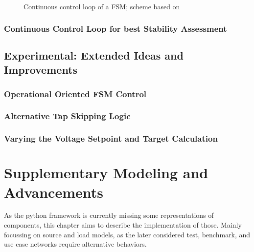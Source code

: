 \begin{figure}[htb!]
        \centering
        \caption{Continuous control loop of a \acs{FSM}; scheme based on \textcite{burlakinEnhancedVoltageControl2024}}
        \label{fig:fsm-continuous-control-loop}
\end{figure}

\subsubsection{Continuous Control Loop for best Stability Assessment}

\subsection{Experimental: Extended Ideas and Improvements}

\subsubsection{Operational Oriented FSM Control}

\subsubsection{Alternative Tap Skipping Logic}

\subsubsection{Varying the Voltage Setpoint and Target Calculation}


\section{Supplementary Modeling and Advancements}

As the python framework is currently missing some representations of components, this chapter aims to describe the implementation of those. Mainly focussing on source and load models, as the later considered test, benchmark, and use case networks require alternative behaviors. 


